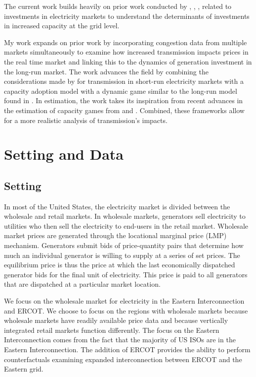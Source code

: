 \documentclass[12pt]{article}
\begin{document}
The current work builds heavily on prior work conducted by \cite{butters2021soaking}, \cite{elliott2022investment}, \cite{gonzales2022dynamic}, \cite{gowrisankaran2024energy} related to investments in electricity markets to understand the determinants of investments in increased capacity at the grid level. 

My work expands on prior work by incorporating congestion data from multiple markets simultaneously to examine how increased transmission impacts prices in the real time market and linking this to the dynamics of generation investment in the long-run market. The work advances the field by combining the considerations made by \cite{gonzales2022dynamic} for transmission in short-run electricity markets with a capacity adoption model with a dynamic game similar to the long-run model found in \cite{elliott2022investment}. In estimation, the work takes its inspiration from recent advances in the estimation of capacity games from \cite{gowrisankaran2024computable} and \cite{pakes1998empirical}. Combined, these frameworks allow for a more realistic analysis of transmission's impacts.


\section{Setting and Data} \label{sec:data}

\subsection{Setting}
In most of the United States, the electricity market is divided between the wholesale and retail markets. In wholesale markets, generators sell electricity to utilities who then sell the electricity to end-users in the retail market. Wholesale market prices are generated through the locational marginal price (LMP) mechanism. Generators submit bids of price-quantity pairs that determine how much an individual generator is willing to supply at a series of set prices. The equilibrium price is thus the price at which the last economically dispatched generator bids for the final unit of electricity. This price is paid to all generators that are dispatched at a particular market location.

We focus on the wholesale market for electricity in the Eastern Interconnection and ERCOT. We choose to focus on the regions with wholesale markets because wholesale markets have readily available price data and because vertically integrated retail markets function differently. The focus on the Eastern Interconnection comes from the fact that the majority of US ISOs are in the Eastern Interconnection. The addition of ERCOT provides the ability to perform counterfactuals examining expanded interconnection between ERCOT and the Eastern grid.
\end{document}
